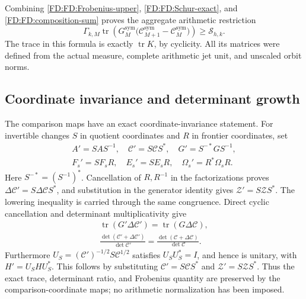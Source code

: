 Combining \eqref{FD:FD:Frobenius-upper}, \eqref{FD:FD:Schur-exact}, and
\eqref{FD:FD:composition-sum} proves the aggregate arithmetic restriction
\begin{equation}
\boxed{\Gamma_{k,M}\operatorname{tr}\!\left(
G_M^{\mathrm{sym}}\bigl(\mathcal C_{M+1}^{\mathrm{sym}}
-\mathcal C_M^{\mathrm{sym}}\bigr)\right)\ge\mathcal S_{h,k}.}
\tag{FD.34}\label{FD:FD:aggregate-bound}
\end{equation}
The trace in this formula is exactly \(\operatorname{tr}K\), by
cyclicity.  All its matrices were defined from the actual measure,
complete arithmetic jet unit, and unscaled orbit norms.

\subsection{Coordinate invariance and determinant growth}

The comparison maps have an exact coordinate-invariance statement.
For invertible changes \(S\) in quotient coordinates and \(R\) in
frontier coordinates, set
\begin{equation}
\begin{gathered}
A'=SAS^{-1},\quad \mathcal C'=S\mathcal CS^*,\quad
G'=S^{-*}GS^{-1},\\
F_s'=SF_sR,\quad E_s'=SE_sR,\quad
\Omega_s'=R^*\Omega_sR.
\end{gathered}
\tag{FD.35}\label{FD:FD:coordinate-change}
\end{equation}
Here \(S^{-*}=(S^{-1})^*\).  Cancellation of \(R,R^{-1}\) in the
factorizations proves \(\Delta\mathcal C'=S\Delta\mathcal CS^*\),
and substitution in the generator identity gives
\(\mathcal Z'=S\mathcal ZS^*\).  The lowering inequality is carried
through the same congruence.  Direct cyclic cancellation and determinant
multiplicativity give
\begin{equation}
\begin{gathered}
\operatorname{tr}(G'\Delta\mathcal C')
=\operatorname{tr}(G\Delta\mathcal C),\\
\frac{\det(\mathcal C'+\Delta\mathcal C')}{\det\mathcal C'}
=\frac{\det(\mathcal C+\Delta\mathcal C)}{\det\mathcal C}.
\end{gathered}
\tag{FD.36}\label{FD:FD:coordinate-invariants}
\end{equation}
Furthermore
\(U_S=(\mathcal C')^{-1/2}S\mathcal C^{1/2}\) satisfies
\(U_SU_S^*=I\), and hence is unitary, with
\(H'=U_SHU_S^*\).  This follows by substituting
\(\mathcal C'=S\mathcal CS^*\) and
\(\mathcal Z'=S\mathcal ZS^*\).
Thus the exact trace, determinant ratio, and Frobenius quantity are
preserved by the comparison-coordinate maps; no arithmetic
normalization has been imposed.

